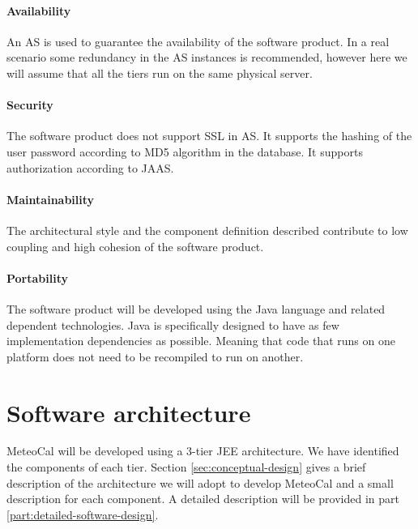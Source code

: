 \documentclass[10pt,a4paper,titlepage]{article}
\begin{document}
\subsection{Availability}
An AS is used to guarantee the availability of the software product. In a real scenario some redundancy in the AS instances is recommended, however here we will assume that all the tiers run on the same physical server.

\subsection{Security}
The software product does not support SSL in AS. It supports the hashing of the user password according to MD5 algorithm in the database. It supports authorization according to JAAS.

\subsection{Maintainability}
The architectural style and the component definition described contribute to low coupling and high cohesion of the software product.

\subsection{Portability}
The software product will be developed using the Java language and related dependent technologies. Java is specifically designed to have as few implementation dependencies as possible. Meaning that code that runs on one platform does not need to be recompiled to run on another.

\clearpage
\part{Software architecture}
\label{part:software-architecture}
MeteoCal will be developed using a 3-tier JEE architecture. We have identified the components of each tier. Section \ref{sec:conceptual-design} gives a brief description of the architecture we will adopt to develop MeteoCal and a small description for each component. A detailed description will be provided in part \ref{part:detailed-software-design}.
\end{document}
